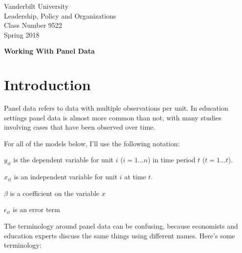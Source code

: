 \documentclass[12pt]{article}
\begin{document}
\thispagestyle{empty}%

\setlength{\parskip}{1ex plus 0.5ex minus 0.2ex}

\setcounter{secnumdepth}{-2}


\begin{flushleft}
Vanderbilt University\\Leadership, Policy and Organizations\\Class Number 9522\\ Spring 2018
\end{flushleft}

\begin{center}
\textbf{Working With Panel Data}
\end{center}

\section{Introduction}

Panel data refers to data with multiple observations per unit. In
education settings panel data is almost more common than not, with
many studies involving cases that have been observed over time.

For all of the models below, I'll use the following notation:

$y_{it}$ is the dependent variable for unit $i$ ($i=1 \ldots n$) in time period $t$ ($t= 1 \ldots t$). 

$x_{it}$ is an independent variable for unit $i$ at time $t$. 

$\beta$ is a coefficient on the variable $x$

$\epsilon_{it}$ is an error term


The terminology around panel data can be confusing, because economists
and education experts discuss the same things using different
names. Here's some terminology:
\end{document}
